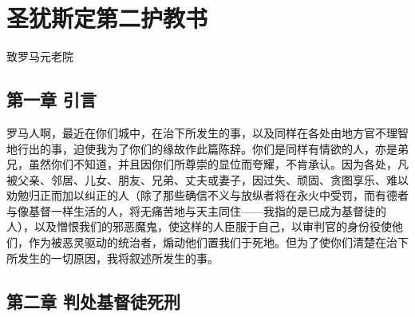 
\chapter{圣犹斯定第二护教书}


致罗马元老院\par


\section{第一章 引言}

罗马人啊，最近在你们城中，在治下所发生的事，以及同样在各处由地方官不理智地行出的事，迫使我为了你们的缘故作此篇陈辞。你们是同样有情欲的人，亦是弟兄，虽然你们不知道，并且因你们所尊崇的显位而夸耀，不肯承认。因为各处，凡被父亲、邻居、儿女、朋友、兄弟、丈夫或妻子，因过失、顽固、贪图享乐、难以劝勉归正而加以纠正的人（除了那些确信不义与放纵者将在永火中受罚，而有德者与像基督一样生活的人，将无痛苦地与天主同住——我指的是已成为基督徒的人），以及憎恨我们的邪恶魔鬼，使这样的人臣服于自己，以审判官的身份役使他们，作为被恶灵驱动的统治者，煽动他们置我们于死地。但为了使你们清楚在治下所发生的一切原因，我将叙述所发生的事。\par


\section{第二章 判处基督徒死刑}

